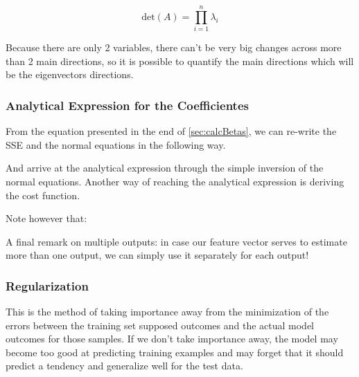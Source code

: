\begin{equation}
    \text{det}(A) = \prod^n_{i = 1} \lambda_i
\end{equation}

Because there are only 2 variables, there can't be very big changes across more than 2 main directions, so it is possible to quantify the main directions which will be the eigenvectors directions.













\subsubsection{Analytical Expression for the Coefficientes}

From the equation presented in the end of \ref{sec:calcBetas}, we can re-write the SSE and the normal equations in the following way. 



And arrive at the analytical expression through the simple inversion of the normal equations. Another way of reaching the analytical expression is deriving the cost function.


Note however that:


A final remark on multiple outputs: in case our feature vector serves to estimate more than one output, we can simply use it separately for each output!


\subsubsection{Regularization}

This is the method of taking importance away from the minimization of the errors between the training set supposed outcomes and the actual model outcomes for those samples. If we don't take importance away, the model may become too good at predicting training examples and may forget that it should predict a tendency and generalize well for the test data.


